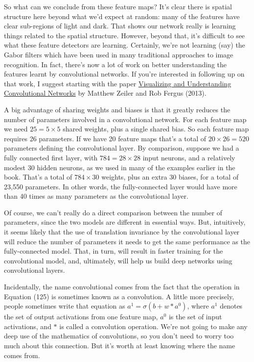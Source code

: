\documentclass[a4paper,twoside,10pt]{book}
\begin{document}
So what can we conclude from these feature maps? It's clear there is spatial structure here beyond what we'd expect at random: many of the features have clear sub-regions of light and dark. That shows our network really is learning things related to the spatial structure. However, beyond that, it's difficult to see what these feature detectors are learning. Certainly, we're not learning (say) the Gabor filters which have been used in many traditional approaches to image recognition. In fact, there's now a lot of work on better understanding the features learnt by convolutional networks. If you're interested in following up on that work, I suggest starting with the paper \href{http://arxiv.org/abs/1311.2901}{Visualizing and Understanding Convolutional Networks} by Matthew Zeiler and Rob Fergus (2013).

A big advantage of sharing weights and biases is that it greatly reduces the number of parameters involved in a convolutional network. For each feature map we need $25=5\times5$ shared weights, plus a single shared bias. So each feature map requires 26 parameters. If we have 20 feature maps that's a total of $20\times26=520$ parameters defining the convolutional layer. By comparison, suppose we had a fully connected first layer, with $784=28\times28$ input neurons, and a relatively modest 30 hidden neurons, as we used in many of the examples earlier in the book. That's a total of $784\times30$ weights, plus an extra 30 biases, for a total of 23,550 parameters. In other words, the fully-connected layer would have more than 40 times as many parameters as the convolutional layer.

Of course, we can't really do a direct comparison between the number of parameters, since the two models are different in essential ways. But, intuitively, it seems likely that the use of translation invariance by the convolutional layer will reduce the number of parameters it needs to get the same performance as the fully-connected model. That, in turn, will result in faster training for the convolutional model, and, ultimately, will help us build deep networks using convolutional layers.

Incidentally, the name convolutional comes from the fact that the operation in Equation (125) is sometimes known as a convolution. A little more precisely, people sometimes write that equation as $a^1=\sigma(b+w\ast a^0)$, where $a^1$ denotes the set of output activations from one feature map, $a^0$ is the set of input activations, and $\ast$ is called a convolution operation. We're not going to make any deep use of the mathematics of convolutions, so you don't need to worry too much about this connection. But it's worth at least knowing where the name comes from.
\end{document}
